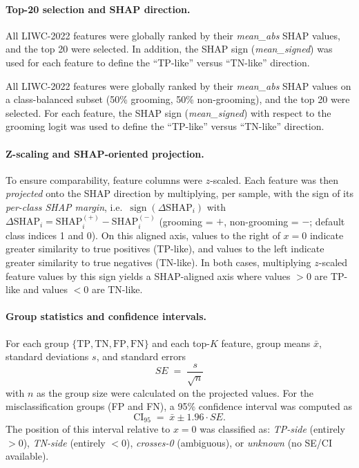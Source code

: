 \paragraph{Top-20 selection and SHAP direction.}
All LIWC-2022 features were globally ranked by their \emph{mean\_abs} SHAP values, and the top 20 were selected. In addition, the SHAP sign (\emph{mean\_signed}) was used for each feature to define the “TP-like” versus “TN-like” direction.

All LIWC-2022 features were globally ranked by their \emph{mean\_abs} SHAP values on a class-balanced subset (50\% grooming, 50\% non-grooming), and the top 20 were selected. For each feature, the SHAP sign (\emph{mean\_signed}) with respect to the grooming logit was used to define the “TP-like” versus “TN-like” direction.

\paragraph{Z-scaling and SHAP-oriented projection.}
To ensure comparability, feature columns were $z$-scaled. Each feature was then \emph{projected} onto the SHAP direction by multiplying, per sample, with the sign of its \emph{per-class SHAP margin}, i.e.\ $\operatorname{sign}(\Delta\mathrm{SHAP}_i)$ with
$\Delta\mathrm{SHAP}_i = \mathrm{SHAP}^{(+)}_i - \mathrm{SHAP}^{(-)}_i$ (grooming = $+$, non-grooming = $-$; default class indices 1 and 0). On this aligned axis, values to the right of $x=0$ indicate greater similarity to true positives (TP-like), and values to the left indicate greater similarity to true negatives (TN-like). In both cases, multiplying $z$-scaled feature values by this sign yields a SHAP-aligned axis where values $>0$ are TP-like and values $<0$ are TN-like.


\paragraph{Group statistics and confidence intervals.}
For each group $\{\mathrm{TP}, \mathrm{TN}, \mathrm{FP}, \mathrm{FN}\}$ and each top-$K$ feature, group means $\bar{x}$, standard deviations $s$, and standard errors
\[
SE \;=\; \frac{s}{\sqrt{n}}
\]
with $n$ as the group size were calculated on the projected values. For the misclassification groups (FP and FN), a 95\% confidence interval was computed as
\[
\mathrm{CI}_{95} \;=\; \bar{x} \pm 1.96 \cdot SE.
\]
The position of this interval relative to $x=0$ was classified as:
\emph{TP-side} (entirely $>0$), \emph{TN-side} (entirely $<0$), \emph{crosses-0} (ambiguous), or \emph{unknown} (no SE/CI available).

